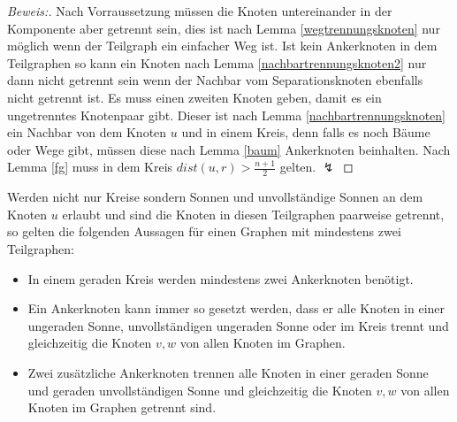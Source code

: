 \vspace{-3mm}
\begin{proof}[Beweis:]
Nach Vorraussetzung müssen die Knoten untereinander in der Komponente aber getrennt sein, dies ist nach Lemma \ref{wegtrennungsknoten} nur möglich wenn der Teilgraph ein einfacher Weg ist. Ist kein Ankerknoten in dem Teilgraphen so kann ein Knoten nach Lemma \ref{nachbartrennungsknoten2} nur dann nicht getrennt sein wenn der Nachbar vom Separationsknoten ebenfalls nicht getrennt ist.  Es muss einen zweiten Knoten geben, damit es ein ungetrenntes Knotenpaar gibt. Dieser ist nach Lemma \ref{nachbartrennungsknoten} ein Nachbar von dem Knoten $u$ und in einem Kreis, denn falls es noch Bäume oder Wege gibt, müssen diese nach Lemma \ref{baum} Ankerknoten beinhalten. Nach Lemma \ref{fg} muss in dem Kreis $dist(u,r)>\frac{n+1}{2}$ gelten. $\lightning$
\end{proof}
\vspace{-2mm}
Werden nicht nur Kreise sondern Sonnen und unvollständige Sonnen an dem Knoten $u$ erlaubt und sind die Knoten in diesen Teilgraphen paarweise getrennt, so gelten die folgenden Aussagen für einen Graphen mit mindestens zwei Teilgraphen:\vspace{1mm}
\begin{lem}
\label{reihenfolge}
\begin{itemize}
\item In einem geraden Kreis werden mindestens zwei Ankerknoten benötigt. 
\item Ein Ankerknoten kann immer so gesetzt werden, dass er alle Knoten in einer ungeraden Sonne, unvollständigen ungeraden Sonne oder im Kreis trennt und gleichzeitig die Knoten $v,w$ von allen Knoten im Graphen.
\item Zwei zusätzliche Ankerknoten trennen alle Knoten in einer geraden Sonne und geraden unvollständigen Sonne und gleichzeitig die Knoten $v,w$ von allen Knoten im Graphen getrennt sind.
\end{itemize}
\end{lem}
\vspace{-2mm}
